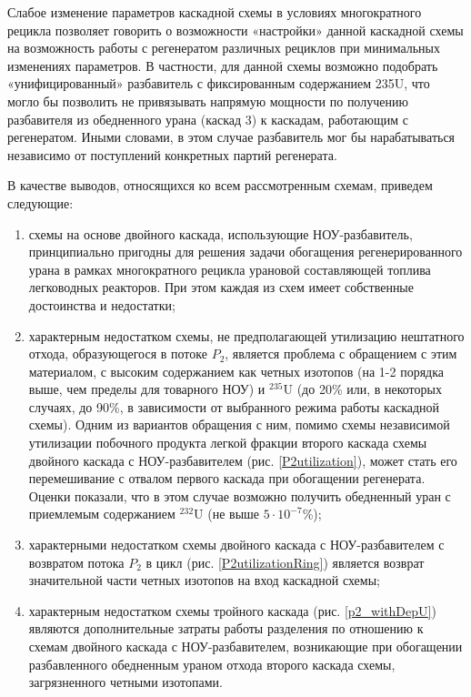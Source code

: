 Слабое изменение параметров каскадной схемы в условиях многократного рецикла позволяет говорить о возможности «настройки» данной каскадной схемы на возможность работы с регенератом различных рециклов при минимальных изменениях параметров. В частности, для данной схемы возможно подобрать «унифицированный» разбавитель с фиксированным содержанием 235U, что могло бы позволить не привязывать напрямую мощности по получению разбавителя из обедненного урана (каскад 3) к каскадам, работающим с регенератом. Иными словами, в этом случае разбавитель мог бы нарабатываться независимо от поступлений конкретных партий регенерата.


В качестве выводов, относящихся ко всем рассмотренным схемам, приведем следующие:
\begin{enumerate}
    \item схемы на основе двойного каскада, использующие НОУ-разбавитель, принципиально пригодны для решения задачи обогащения регенерированного урана в рамках многократного рецикла урановой составляющей топлива легководных реакторов. При этом каждая из схем имеет собственные достоинства и недостатки;
    \item характерным недостатком схемы, не предполагающей утилизацию нештатного отхода, образующегося в потоке $P_2$, является проблема с обращением с этим материалом, с высоким содержанием как четных изотопов (на 1-2 порядка выше, чем пределы для товарного НОУ) и $^{235}$U (до 20\% или, в некоторых случаях, до 90\%, в зависимости от выбранного режима работы каскадной схемы). Одним из вариантов обращения с ним, помимо схемы независимой утилизации побочного продукта легкой фракции второго каскада схемы двойного каскада с НОУ-разбавителем (рис. \ref{P2utilization}), может стать его перемешивание с отвалом первого каскада при обогащении регенерата. Оценки показали, что в этом случае возможно получить обедненный уран с приемлемым содержанием $^{232}$U (не выше $5\cdot10^{-7}$\%);
    \item характерными недостатком схемы двойного каскада с НОУ-разбавителем с возвратом потока $P_2$ в цикл (рис. \ref{P2utilizationRing}) является возврат значительной части четных изотопов на вход каскадной схемы;
    \item характерным недостатком схемы тройного каскада (рис. \ref{p2_withDepU}) являются дополнительные затраты работы разделения по отношению к схемам двойного каскада с НОУ-разбавителем, возникающие при обогащении разбавленного обедненным ураном отхода второго каскада схемы, загрязненного четными изотопами.
  \end{enumerate}


